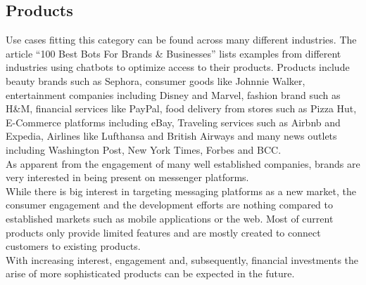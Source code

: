 \subsection{Products}

Use cases fitting this category can be found across many different industries. The article ``100 Best Bots For Brands \& Businesses''\cite{topbots} lists examples from different industries using chatbots to optimize access to their products. Products include beauty brands such as Sephora, consumer goods like Johnnie Walker, entertainment companies including Disney and Marvel, fashion brand such as H\&M, financial services like PayPal, food delivery from stores such as Pizza Hut, E-Commerce platforms including eBay, Traveling services such as Airbnb and Expedia, Airlines like Lufthansa and British Airways and many news outlets including Washington Post, New York Times, Forbes and BCC.
\\


As apparent from the engagement of many well established companies, brands are very interested in being present on messenger platforms.
\\

While there is big interest in targeting messaging platforms as a new market, the consumer engagement and the development efforts are nothing compared to established markets such as mobile applications or the web. Most of current products only provide limited features and are mostly created to connect customers to existing products.
\\

With increasing interest, engagement and, subsequently, financial investments the arise of more sophisticated products can be expected in the future.
